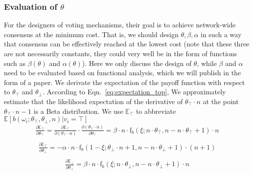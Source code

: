 \documentclass[11pt]{article}
\begin{document}
\subsubsection{Evaluation of $\theta$}
For the designers of voting mechanisms, their goal is to achieve network-wide consensus at the minimum cost. That is, we should design $\theta, \beta, \alpha$ in such a way that consensus can be effectively reached at the lowest cost (note that these three are not necessarily constants, they could very well be in the form of functions such as $\beta(\theta)$ and $\alpha(\theta)$). Here we only discuss the design of $\theta$, while $\beta$ and $\alpha$ need to be evaluated based on functional analysis, which we will publish in the form of a paper. We derivate the expectation of the payoff function with respect to $\theta_\top$ and $\theta_\bot$. According to Eqn.~\ref{eq:expectation_top}, We approximately estimate that the likelihood expectation of the derivative of $\theta_\top\cdot n$ at the point $\theta_\top\cdot n -1$ is a Beta distribution. We use $\mathbb{E}_\top$ to abbreviate $\mathbb{E}[b(\omega_i;\theta_\top,\theta_\bot,n)|v_i=\top]$
\begin{equation}
  \label{eq:expectation_top_to_top}
  \begin{aligned}
  \frac{\partial{\mathbb{E}}_\top}{\partial{\theta_\top}}=\frac{\partial\mathbb{E}_\top}{\partial(\theta_\top\cdot n)}\cdot\frac{\partial(\theta_\top\cdot n)}{\partial\theta_\top}= \beta\cdot n \cdot \text{f}_b(\xi;n\cdot\theta_\top,n-n\cdot\theta_\top+1)\cdot{n}\\
  \end{aligned}
\end{equation}
\begin{equation}
  \label{eq:expectation_top_to_bot}
  \begin{aligned}
  \frac{\partial{\mathbb{E}}_\top}{\partial{\theta_\bot}}= -\alpha\cdot n \cdot  \text{f}_b(1-\xi;\theta_\bot\cdot n+1,n-n\cdot\theta_\bot+1)\cdot(n+1)\\
  \end{aligned}
\end{equation}
\begin{equation}
  \label{eq:expectation_bot_to_bot}
  \begin{aligned}
  \frac{\partial{\mathbb{E}}_\bot}{\partial{\theta_\bot}}= \beta\cdot n \cdot \text{f}_b(\xi;n\cdot\theta_\bot,n-n\cdot\theta_\bot+1)\cdot{n}\\
  \end{aligned}
\end{equation}
\end{document}
